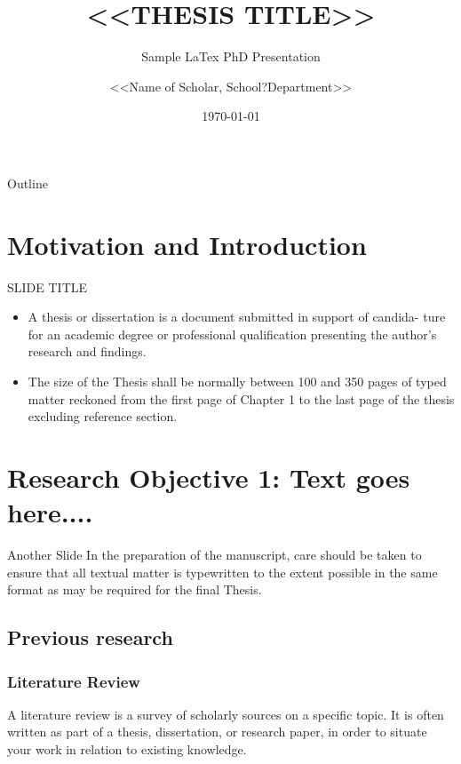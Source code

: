 \documentclass{beamer}
\title{<<THESIS TITLE>>}
\author{<<Name of Scholar, School?Department>>}
\institute{
	\begin{tabular}{c}
		Guide: NAME-1 \\
		Co-guide: NAME-2
	\end{tabular}
}
\date{\today}
\subtitle{Sample LaTex PhD Presentation}
\begin{document}
\begin{frame}[plain]
    \maketitle
    
\end{frame}
\begin{frame}{Outline}
	\tableofcontents[hideallsubsections]
\end{frame}
\section{Motivation and Introduction}
\begin{frame}{SLIDE TITLE}
	\begin{itemize}
		\item A thesis or dissertation is a document submitted in support of candida-
		ture for an academic degree or professional qualification presenting the author’s research and findings.
		\vspace{3mm}
		\item The size of the Thesis shall be normally between 100 and 350 pages of typed matter reckoned	from the first page of Chapter 1 to the last page of the thesis excluding reference section.
	\end{itemize}
\end{frame}


\section[Research Objective 1]{Research Objective 1: Text goes here....}

\begin{frame}{Another Slide}
In the preparation of the manuscript, care should be taken to ensure that all textual matter is
typewritten to the extent possible in the same format as may be required for the final Thesis.
\end{frame}
\subsection{Previous research}
\begin{frame}
	\frametitle{Literature Review}
	A literature review is a survey of scholarly sources on a specific topic. It is often written as part of a thesis, dissertation, or research paper, in order to situate your work in relation to existing knowledge.
\end{frame}
\end{document}
